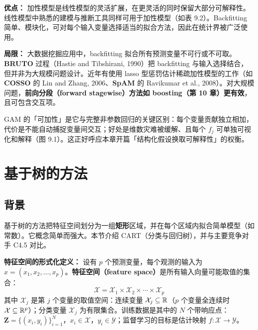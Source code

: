 \textbf{优点：} 加性模型是线性模型的灵活扩展，在更灵活的同时保留大部分可解释性。线性模型中熟悉的建模与推断工具同样可用于加性模型（如表 9.2）。Backfitting 简单、模块化，可对每个输入变量选择适当的拟合方法，因此在统计界被广泛使用。

\textbf{局限：} 大数据挖掘应用中，backfitting 拟合所有预测变量不可行或不可取。\textbf{BRUTO} 过程（Hastie and Tibshirani, 1990）把 backfitting 与输入选择结合，但并非为大规模问题设计。近年有使用 lasso 型惩罚估计稀疏加性模型的工作（如 \textbf{COSSO} 的 Lin and Zhang, 2006、\textbf{SpAM} 的 Ravikumar et al., 2008）。对大规模问题，\textbf{前向分段（forward stagewise）方法如 boosting（第 10 章）更有效}，且可包含交互项。

\begin{remark}
    GAM 的「可加性」是它与完整非参数回归的关键区别：每个变量贡献独立相加，代价是不能自动捕捉变量间交互；好处是维数灾难被缓解、且每个 $f_j$ 可单独可视化和解释（图 9.1）。这正好呼应本章开篇「结构化假设换取可解释性」的权衡。
\end{remark}

\section{基于树的方法}

\subsection{背景}

基于树的方法把特征空间划分为一组\textbf{矩形}区域，并在每个区域内拟合简单模型（如常数）。它概念简单而强大。本节介绍 CART（分类与回归树），并与主要竞争对手 C4.5 对比。

\textbf{特征空间的形式化定义：} 设有 $p$ 个预测变量，每个观测的输入为 $x = (x_1, x_2, \ldots, x_p)$。\textbf{特征空间（feature space）}是所有输入向量可能取值的集合：
\begin{equation}\label{eq:feature_space}
    \mathcal{X} = \mathcal{X}_1 \times \mathcal{X}_2 \times \cdots \times \mathcal{X}_p
\end{equation}
其中 $\mathcal{X}_j$ 是第 $j$ 个变量的取值空间：连续变量 $\mathcal{X}_j \subseteq \mathbb{R}$（$p$ 个变量全连续时 $\mathcal{X} \subseteq \mathbb{R}^p$）；分类变量 $\mathcal{X}_j$ 为有限集合。训练数据是其中的 $N$ 个带响应点：$\mathbf{Z} = \{(x_i, y_i)\}_{i=1}^{N}$，$x_i \in \mathcal{X}$，$y_i \in \mathcal{Y}$；监督学习的目标是估计映射 $f: \mathcal{X} \to \mathcal{Y}$。

